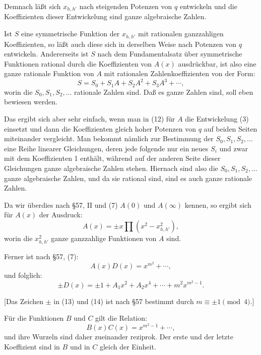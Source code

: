 \documentclass[12pt,a4paper]{article}
\begin{document}
Demnach l\"a\ss{}t sich $x_{h,h'}$ nach steigenden Potenzen von $q$ entwickeln und die Koeffizienten dieser Entwickelung sind ganze algebraische Zahlen.

Ist $S$ eine symmetrische Funktion der $x_{h,h'}$ mit rationalen ganzzahligen Koeffizienten, so l\"a\ss{}t auch diese sich in derselben Weise nach Potenzen von $q$ entwickeln. Andererseits ist $S$ nach dem Fundamentalsatz \"uber symmetrische Funktionen rational durch die Koeffizienten von $A(x)$ ausdr\"uckbar, ist also eine ganze rationale Funktion von $A$ mit rationalen Zahlenkoeffizienten von der Form:
\begin{equation}S = S_0 + S_1 A + S_2 A^2 + S_3 A^3 + \cdots,\end{equation}
worin die $S_0, S_1, S_2, \ldots$ rationale Zahlen sind. Da\ss{} es ganze Zahlen sind, soll eben bewiesen werden.

Das ergibt sich aber sehr einfach, wenn man in (12) f\"ur $A$ die Entwickelung (3) einsetzt und dann die Koeffizienten gleich hoher Potenzen von $q$ auf beiden Seiten miteinander vergleicht. Man bekommt n\"amlich zur Bestimmung der $S_0, S_1, S_2, \ldots$ eine Reihe linearer Gleichungen, deren jede folgende nur ein neues $S_i$ und zwar mit dem Koeffizienten 1 enth\"alt, w\"ahrend auf der anderen Seite dieser Gleichungen ganze algebraische Zahlen stehen. Hiernach sind also die $S_0, S_1, S_2, \ldots$ ganze algebraische Zahlen, und da sie rational sind, sind es auch ganze rationale Zahlen.

Da wir \"uberdies nach \S 57, II und (7) $A(0)$ und $A(\infty)$ kennen, so ergibt sich f\"ur $A(x)$ der Ausdruck:
\begin{equation}A(x) = \pm x \prod (x^2 - x_{h,h'}^2),\end{equation}
worin die $x_{h,h'}^2$ ganze ganzzahlige Funktionen von $A$ sind.

Ferner ist nach \S 57, (7):
\[A(x) D(x) = x^{m^2} + \cdots,\]
und folglich:
\begin{equation}\pm D(x) = \pm 1 + A_1 x^2 + A_2 x^4 + \cdots + m^2 x^{m^2-1}.\end{equation}

[Das Zeichen $\pm$ in (13) und (14) ist nach \S 57 bestimmt durch $m \equiv \pm 1 \pmod{4}$.]

F\"ur die Funktionen $B$ und $C$ gilt die Relation:
\begin{equation}B(x) C(x) = x^{m^2-1} + \cdots,\end{equation}
und ihre Wurzeln sind daher zueinander reziprok. Der erste und der letzte Koeffizient sind in $B$ und in $C$ gleich der Einheit.
\end{document}
